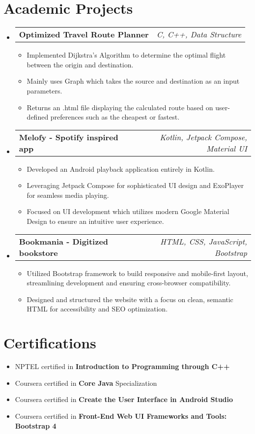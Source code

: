 \documentclass[a4paper,20pt]{article}
\makeatletter
\newcommand{\resumeSimpleItem}[2]{
  \item\small{
    {#1}{#2 \vspace{-2pt}}
  }
}
\newcommand{\resumeSkillSubheading}[4]{
  \vspace{-1pt}\item
    \begin{tabular*}{0.98\textwidth}{l@{\extracolsep{\fill}}r}
      \textbf{#1} & \textit{#2} \\
    \end{tabular*}\vspace{-5pt}
}
\newcommand{\resumeSimpleSubItem}[2]{\resumeSimpleItem{#1}{#2}\vspace{-3pt}}
\newcommand{\resumeSubHeadingListStart}{\begin{itemize}[leftmargin=*]}
\newcommand{\resumeSubHeadingListEnd}{\end{itemize}}
\newcommand{\resumeSubHeadingSimpleListStart}{\begin{itemize}[leftmargin=*]}
\newcommand{\resumeSubHeadingSimpleListEnd}{\end{itemize}}
\makeatother
\begin{document}
\section{Academic Projects}
\resumeSubHeadingListStart
\resumeSkillSubheading{Optimized Travel Route Planner}{C, C++, Data Structure}
\vspace {-2pt}
\resumeSubHeadingSimpleListStart
\resumeSimpleSubItem{Implemented Dijkstra’s Algorithm to determine the optimal flight between the origin and destination.}{}
\vspace{2pt}
\resumeSimpleSubItem{Mainly uses Graph which takes the source and destination as an input parameters.}{}
\vspace{2pt}
\resumeSimpleSubItem{Returns an .html file displaying the calculated route based on user-defined preferences such as the cheapest or fastest.}{}
\resumeSubHeadingSimpleListEnd
\vspace{2pt}

\resumeSkillSubheading{Melofy - Spotify inspired app} {Kotlin, Jetpack Compose, Material UI}
\vspace{-2pt}
\resumeSubHeadingSimpleListStart
\resumeSimpleSubItem{Developed an Android playback application entirely in Kotlin.}{}
\vspace{2pt}
\resumeSimpleSubItem{Leveraging Jetpack Compose for sophisticated UI design and ExoPlayer for seamless media playing.}{}
\vspace{2pt}
\resumeSimpleSubItem{Focused on UI development which utilizes modern Google Material Design to ensure an intuitive user experience.}{}
\resumeSubHeadingSimpleListEnd
\vspace{2pt}

\resumeSkillSubheading{Bookmania - Digitized bookstore}{HTML, CSS, JavaScript, Bootstrap}
\vspace{-2pt}
\resumeSubHeadingSimpleListStart
\resumeSimpleSubItem {Utilized Bootstrap framework to build responsive and mobile-first layout, streamlining development and ensuring cross-browser compatibility.}{}
\vspace{2pt}
\resumeSimpleSubItem{Designed and structured the website with a focus on clean, semantic HTML for accessibility and SEO optimization.}{}
\resumeSubHeadingSimpleListEnd
\resumeSubHeadingListEnd
\vspace{3pt}


\section{Certifications}
\resumeSubHeadingSimpleListStart
\resumeSimpleSubItem {NPTEL certified in \textbf{Introduction to Programming through C++}}{}
\resumeSimpleSubItem {Coursera certified in \textbf{Core Java} Specialization}{}
\resumeSimpleSubItem {Coursera certified in \textbf{Create the User Interface in Android Studio}}{}
\resumeSimpleSubItem {Coursera certified in \textbf{Front-End Web UI Frameworks and Tools: Bootstrap 4}}{}
\resumeSubHeadingSimpleListEnd
\vspace{2pt}
\end{document}
